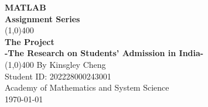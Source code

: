 \documentclass[11pt]{article}
\begin{document}
\cleardoublepage
\begin{titlepage}
\begin{center}
\vspace*{1cm}
\Large{\textbf{MATLAB}}\\
\Large{\textbf{Assignment Series}}\\
\vfill
\line(1,0){400}\\[1mm]
\huge{\textbf{The Project}}\\[3mm]
\Large{\textbf{-The Research on Students' Admission in India-}}\\[1mm]
\line(1,0){400}
\vfill
By Kinsgley Cheng\\
Student ID: 202228000243001\\
Academy of Mathematics and System Science\\
\today \\
\end{center}
\end{titlepage}
\end{document}
